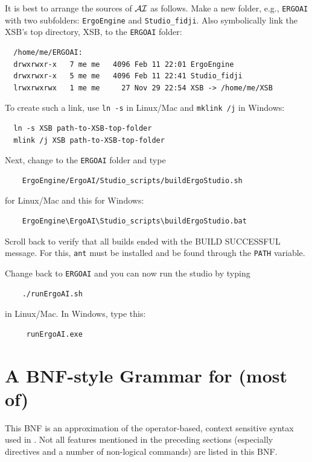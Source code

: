 \documentclass[11pt]{article}
\newcommand{\ERGO}{\mbox{\smaller{\ensuremath{\cal{E}}\smaller{{\sc{RGO}}}}}\xspace}
\newcommand{\ERGOAI}{\mbox{\smaller{\ensuremath{\cal{E}}\smaller{{\sc{RGO}}}}\ensuremath{\cal{AI}}}\xspace}
\newcommand{\FLSYSTEM}{\ERGO}
\begin{document}
It is best to arrange the sources of \ERGOAI as follows. Make a new folder,
e.g., \texttt{ERGOAI} with two subfolders: \texttt{ErgoEngine} and
\texttt{Studio\_fidji}. Also symbolically link the XSB's top directory, XSB,  
to the \texttt{ERGOAI} folder:
\begin{verbatim}
  /home/me/ERGOAI:
  drwxrwxr-x   7 me me   4096 Feb 11 22:01 ErgoEngine
  drwxrwxr-x   5 me me   4096 Feb 11 22:41 Studio_fidji
  lrwxrwxrwx   1 me me     27 Nov 29 22:54 XSB -> /home/me/XSB
\end{verbatim}
To create such a link, use \texttt{ln -s} in Linux/Mac and   
\texttt{mklink /j} in Windows:
\begin{verbatim}
  ln -s XSB path-to-XSB-top-folder
  mlink /j XSB path-to-XSB-top-folder
\end{verbatim}
\noindent
Next, change to the \texttt{ERGOAI} folder and type
\begin{verbatim}
    ErgoEngine/ErgoAI/Studio_scripts/buildErgoStudio.sh
\end{verbatim}
for Linux/Mac and this for Windows:
\begin{verbatim}
    ErgoEngine\ErgoAI\Studio_scripts\buildErgoStudio.bat
\end{verbatim}
Scroll back to verify that all builds ended with the BUILD SUCCESSFUL message.
For this, \texttt{ant} must be installed and be found through the
\texttt{PATH} variable.  

\noindent
Change back to \texttt{ERGOAI} and  you can
now run the studio by typing
\begin{verbatim}
    ./runErgoAI.sh
\end{verbatim}
in Linux/Mac. In Windows, type this:
\begin{verbatim}
     runErgoAI.exe
\end{verbatim}


\section{A BNF-style Grammar for (most of) \FLSYSTEM}\label{app-bnf}

This BNF is an approximation of the operator-based,
context sensitive syntax used in \FLSYSTEM. Not all features mentioned in
the preceding sections (especially directives and a number of
non-logical commands) are listed in this BNF.
\end{document}
